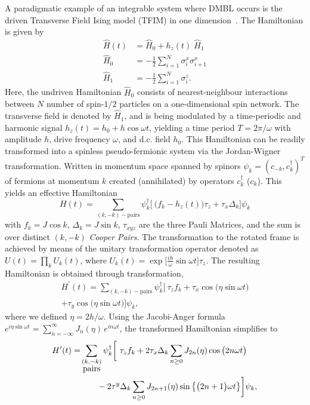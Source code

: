 \documentclass[%
reprint,
superscriptaddress,
amsmath,amssymb,
aps,
prb,
]{revtex4-2}
\begin{document}
	A paradigmatic example of an integrable system where DMBL occurs is  the driven Transverse Field Ising model (TFIM) in one dimension~\cite{stinchcombe_ising_1973}. The Hamiltonian is given by
	\begin{align}
		\label{eq:tfim:hamilt}
		\hat{H}(t) &= \hat{H}_0 + h_z(t) \; \hat{H}_1\\
		\hat{H}_0 &= -\frac{1}{2}\sum^N_{i=1} \sigma^x_i \sigma^x_{i+1}\\
		\hat{H}_1 &= -\frac{1}{2}\sum_{i=1}^N \sigma^z_{i}.
	\end{align}
Here, the undriven Hamiltonian $\hat{H}_0$ consists of nearest-neighbour interactions between $N$ number of  spin-$1/2$ particles on a one-dimensional spin network. The transverse field is denoted by $\hat{H}_1$, and is being modulated by a time-periodic and harmonic signal $h_z(t) = h_0 + h\cos{\omega t}$, yielding a time period $T=2\pi/\omega$ with amplitude $h$, drive frequency $\omega$, and d.c. field $h_0$. This Hamiltonian can be readily transformed into a spinless pseudo-fermionic system via the Jordan-Wigner transformation. Written in momentum space spanned by spinors $\psi_k = (c_{-k}, c^\dagger_k)^T$ of fermions at momentum $k$ created (annihilated) by operators $c^\dagger_k$ ($c_k$). This yields an effective Hamiltonian ~\cite{mbeng_quantum_2020}
	\begin{equation}
		H(t) = \sum_{(k,-k)-\mbox{pairs}} \psi^\dagger_k
		\Bigg[\ \bigg(f_k - h_z(t)\bigg)\tau_z +  \tau_x \Delta_k\Bigg]\psi_k
	\end{equation}
	with $f_k = J\cos{k}$, $\Delta_k = J\sin{k}$, $\tau_{xyz}$ are the three Pauli Matrices, and the sum is over distinct $(k, -k)$ \textit{Cooper Pairs}. The transformation to the rotated frame is achieved by means of the unitary transformation operator denoted as $U(t) = \prod_k U_k(t)$, where $U_k(t) = \exp{\Big[\frac{i h}{\omega}\sin{\omega t}\Big]\tau_z}$. The resulting Hamiltonian is obtained through transformation,
	\begin{multline*}
		H^\prime(t) = \sum_{(k,-k)-\mbox{pairs}} \psi^\dagger_k
		\bigg[\ \tau_z f_k + \tau_x \cos{\big(\eta\sin{\omega t}\big)}  \\
		+ \tau_y \cos{\big(\eta\sin{\omega t}\big)}\bigg]\psi_k,
	\end{multline*}
	where we defined $\eta=2h/\omega$. Using the Jacobi-Anger formula $e^{i \eta \sin{\omega t}} = \sum_{n=-\infty}^{\infty} J_n(\eta)\, e^{i n \omega t}$, the transformed Hamiltonian simplifies to \\
	\begin{align}
		H^\prime(t) =& \sum_{\substack{(k,-k) \\ \mbox{pairs}}} \psi^\dagger_k
		\bigg[\ \tau_z f_k + 2\tau_x \Delta_k \sum_{n\geq 0} J_{2n}(\eta)\cos{\big(2n\omega t\big)} \nonumber\\
		&\hskip 0.7cm- 2\tau^y\Delta_k \sum_{n\geq 0} J_{2n+1}(\eta)\sin{\big\{\big(2n+1\big)\omega t\big\}}   \bigg]\psi_k,
	\end{align}\\
	
\end{document}
